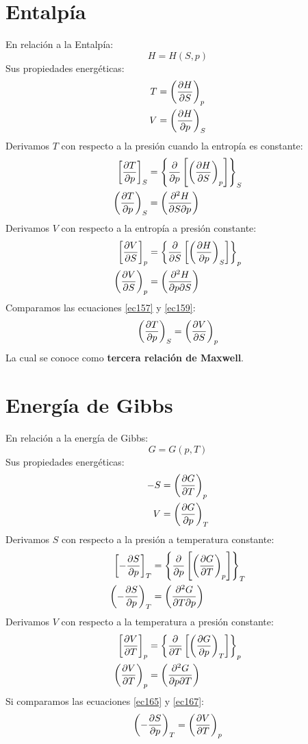 \documentclass[../main]{subfiles}
\begin{document}
\section{Entalpía}
En relación a la Entalpía:
\begin{equation}
    H=H(S,p)
\end{equation}
Sus propiedades energéticas:
\begin{align}
    T&=\left( \pdv{H}{S} \right)_p \\
    V&=\left( \pdv{H}{p}\right)_S
\end{align}
Derivamos $T$ con respecto a la presión cuando la entropía es constante:
\begin{align}
    \left[ \pdv{T}{p}\right]_S&=\left\{ \pdv{}{p}\left[\left( \pdv{H}{S}\right)_p \right] \right\}_S \\
    \left( \pdv{T}{p}\right)_S&=\left( \pdv{^2 H}{S \partial p}\right)
    \label{ec157}
\end{align}
Derivamos $V$ con respecto a la entropía a presión constante:
\begin{align}
    \left[ \pdv{V}{S}\right]_p&=\left\{ \pdv{}{S}\left[\left( \pdv{H}{p}\right)_S \right] \right\}_p \\
    \left( \pdv{V}{S}\right)_p&=\left( \pdv{^2 H}{p \partial S}\right)
    \label{ec159}
\end{align}
Comparamos las ecuaciones \eqref{ec157} y \eqref{ec159}:
\begin{equation}
    \left( \pdv{T}{p}\right)_S=\left( \pdv{V}{S}\right)_p
\end{equation}
La cual se conoce como \textbf{tercera relación de Maxwell}.
\section{Energía de Gibbs}
En relación a la energía de Gibbs:
\begin{equation}
    G=G(p,T)
\end{equation}
Sus propiedades energéticas:
\begin{align}
    -S&=\left( \pdv{G}{T} \right)_p \\
    V&=\left( \pdv{G}{p}\right)_T
\end{align}
Derivamos $S$ con respecto a la presión a temperatura constante:
\begin{align}
    \left[ -\pdv{S}{p}\right]_T&=\left\{ \pdv{}{p}\left[\left( \pdv{G}{T}\right)_p \right] \right\}_T \\
    \left(- \pdv{S}{p}\right)_T&=\left( \pdv{^2 G}{T \partial p}\right)
    \label{ec165}
\end{align}
Derivamos $V$ con respecto a la temperatura a presión constante:
\begin{align}
    \left[ \pdv{V}{T}\right]_p&=\left\{ \pdv{}{T}\left[\left( \pdv{G}{p}\right)_T \right] \right\}_p \\
    \left( \pdv{V}{T}\right)_p&=\left( \pdv{^2 G}{p \partial T}\right)
    \label{ec167}
\end{align}
Si comparamos las ecuaciones \eqref{ec165} y \eqref{ec167}:
\begin{equation}
    \left(- \pdv{S}{p}\right)_T=\left( \pdv{V}{T}\right)_p
\end{equation}
\end{document}
